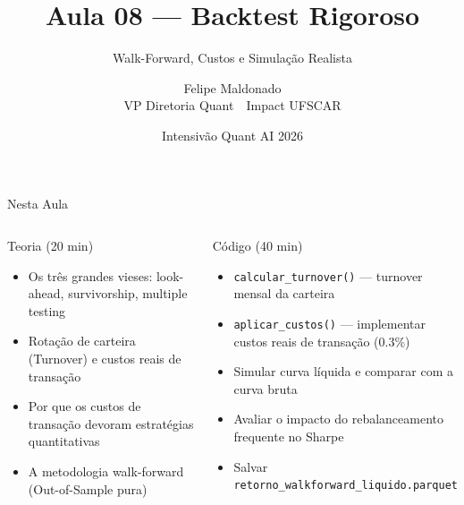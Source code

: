 \documentclass[aspectratio=169,12pt]{beamer}
\author{Felipe Maldonado\\{\scriptsize VP Diretoria Quant~\textbullet{}~Impact UFSCAR}}
\date{Intensivão Quant AI 2026}
\title{Aula 08 --- Backtest Rigoroso}
\subtitle{Walk-Forward, Custos e Simulação Realista}
\begin{document}
\begin{frame}[plain]
\titlepage
\end{frame}

\begin{frame}[fragile]{Nesta Aula}
\begin{columns}[T]
\begin{block}{Teoria (20 min)}
\begin{itemize}
  \item Os três grandes vieses: look-ahead, survivorship, multiple testing
  \item Rotação de carteira (Turnover) e custos reais de transação
  \item Por que os custos de transação devoram estratégias quantitativas
  \item A metodologia walk-forward (Out-of-Sample pura)
\end{itemize}
\end{block}
\begin{block}{Código (40 min)}
\begin{itemize}
  \item \texttt{calcular\_turnover()} — turnover mensal da carteira
  \item \texttt{aplicar\_custos()} — implementar custos reais de transação (0.3\%)
  \item Simular curva líquida e comparar com a curva bruta
  \item Avaliar o impacto do rebalanceamento frequente no Sharpe
  \item Salvar \texttt{retorno\_walkforward\_liquido.parquet}
\end{itemize}
\end{block}
\end{columns}
\end{frame}
\end{document}

